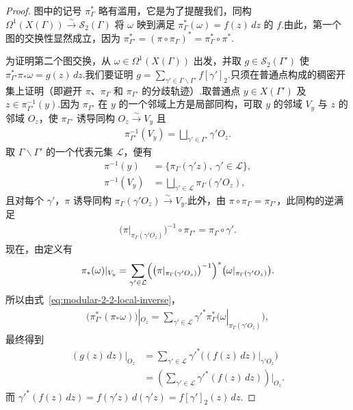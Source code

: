 \begin{proof}

图中的记号 $\pi_\Gamma^*$ 略有滥用，它是为了提醒我们，同构 $\Omega^1(X(\Gamma))\xrightarrow{\sim}\mathcal S_2(\Gamma)$ 将 $\omega$ 映到满足 $\pi_\Gamma^*(\omega)=f(z)\,dz$ 的 $f$.由此，第一个图的交换性显然成立，因为 $\pi_{\Gamma'}^*=(\pi\circ\pi_\Gamma)^*=\pi_\Gamma^*\circ\pi^*$.



为证明第二个图交换，从 $\omega\in\Omega^1(X(\Gamma))$ 出发，并取 $g\in\mathcal S_2(\Gamma')$ 使 $\pi_{\Gamma'}^*\pi_*\omega=g(z)\,dz$.我们要证明 $g=\sum_{\gamma'\in\Gamma\backslash\Gamma'}f[\gamma']_2$.只须在普通点构成的稠密开集上证明（即避开 $\pi$、$\pi_\Gamma$ 和 $\pi_{\Gamma'}$ 的分歧轨迹）.取普通点 $y\in X(\Gamma')$ 及 $z\in\pi_{\Gamma'}^{-1}(y)$.因为 $\pi_{\Gamma'}$ 在 $y$ 的一个邻域上方是局部同构，可取 $y$ 的邻域 $V_y$ 与 $z$ 的邻域 $O_z$，使 $\pi_{\Gamma'}$ 诱导同构 $O_z\xrightarrow{\sim}V_y$ 且
\begin{align*}
\pi_{\Gamma'}^{-1}(V_y)=\bigsqcup_{\gamma'\in\Gamma'}\gamma'O_z.
\end{align*}
取 $\Gamma\backslash\Gamma'$ 的一个代表元集 $\mathcal L$，便有
\begin{align*}
\pi^{-1}(y)&=\{\pi_\Gamma(\gamma'z),\ \gamma'\in\mathcal L\},\\
\pi^{-1}(V_y)&=\bigsqcup_{\gamma'\in\mathcal L}\pi_\Gamma(\gamma'O_z),
\end{align*}
且对每个 $\gamma'$，$\pi$ 诱导同构 $\pi_\Gamma(\gamma'O_z)\xrightarrow{\sim}V_y$.此外，由 $\pi\circ\pi_\Gamma=\pi_{\Gamma'}$，此同构的逆满足
\begin{align*}
\bigl(\pi|_{\pi_\Gamma(\gamma'O_z)}\bigr)^{-1}\circ\pi_{\Gamma'}=\pi_\Gamma\circ\gamma'.\tag{$*$}\label{eq:modular-2-2-local-inverse}
\end{align*}
现在，由定义有
\begin{align*}
\pi_*(\omega)|_{V_y}=\sum_{\gamma'\in\mathcal L}\Bigl(\bigl(\pi|_{\pi_\Gamma(\gamma'O_z)}\bigr)^{-1}\Bigr)^*\bigl(\omega|_{\pi_\Gamma(\gamma'O_z)}\bigr).
\end{align*}
所以由式~\eqref{eq:modular-2-2-local-inverse}，
\begin{align*}
\bigl(\pi_{\Gamma'}^*(\pi_*\omega)\bigr)|_{O_z}=\sum_{\gamma'\in\mathcal L}\gamma'^*\pi_\Gamma^*\bigl(\omega|_{\pi_\Gamma(\gamma'O_z)}\bigr),
\end{align*}
最终得到
\begin{align*}
(g(z)\,dz)|_{O_z}
&=\sum_{\gamma'\in\mathcal L}\gamma'^*\bigl((f(z)\,dz)|_{\gamma'O_z}\bigr)\\
&=\left(\sum_{\gamma'\in\mathcal L}\gamma'^*(f(z)\,dz)\right)\Big|_{O_z}.
\end{align*}
而 $\gamma'^*(f(z)\,dz)=f(\gamma'z)\,d(\gamma'z)=f[\gamma']_2(z)\,dz$.

\end{proof}




